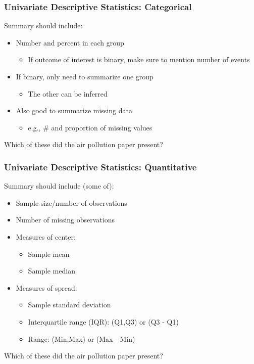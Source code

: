 \documentclass[12pt, 
hyperref={colorlinks=true, linkcolor=blue, urlcolor=cyan}]{beamer}
\begin{document}
\begin{frame}
\frametitle{Univariate Descriptive Statistics: Categorical}

Summary should include:
\begin{itemize}
\item Number and percent in each group
	\begin{itemize}
	\item If outcome of interest is binary, make sure to mention number of events
	\end{itemize}
\item If binary, only need to summarize one group
	\begin{itemize}
	\item The other can be inferred
	\end{itemize}
\item Also good to summarize missing data
	\begin{itemize}
	\item e.g., \#  and proportion of missing values
	\end{itemize}
\end{itemize}

Which of these did the air pollution paper present? %

\end{frame}

\begin{frame}
\frametitle{Univariate Descriptive Statistics: Quantitative}

Summary should include (some of):
\begin{itemize}
\item Sample size/number of observations
\item Number of missing observations
\item Measures of center: 
	\begin{itemize}
	\item Sample mean
	\item Sample median
	\end{itemize}
\item Measures of spread:
	\begin{itemize}
	\item Sample standard deviation
	\item Interquartile range (IQR): (Q1,Q3) or (Q3 - Q1)
	\item Range: (Min,Max) or (Max - Min)
	\end{itemize}
\end{itemize}
Which of these did the air pollution paper present? %
\end{frame}
\end{document}
